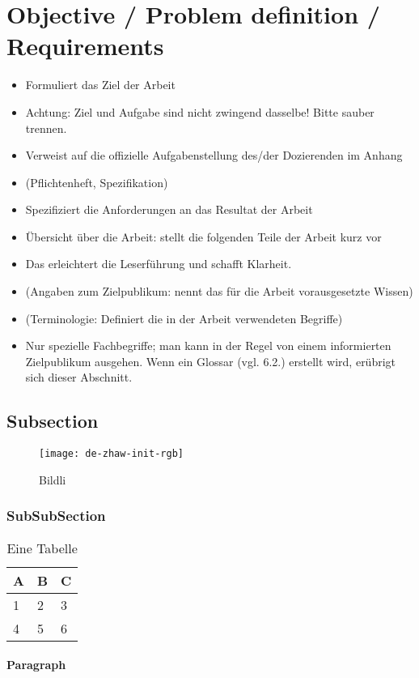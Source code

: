\section{Objective / Problem definition / Requirements}
\begin{itemize}
    \item Formuliert das Ziel der Arbeit
    \item Achtung: Ziel und Aufgabe sind nicht zwingend dasselbe! Bitte sauber trennen.
    \item Verweist auf die offizielle Aufgabenstellung des/der Dozierenden im Anhang
    \item (Pflichtenheft, Spezifikation)
    \item Spezifiziert die Anforderungen an das Resultat der Arbeit
    \item Übersicht über die Arbeit: stellt die folgenden Teile der Arbeit kurz vor
    \item Das erleichtert die Leserführung und schafft Klarheit.
    \item (Angaben zum Zielpublikum: nennt das für die Arbeit vorausgesetzte Wissen)
    \item (Terminologie: Definiert die in der Arbeit verwendeten Begriffe)
    \item Nur spezielle Fachbegriffe; man kann in der Regel von einem informierten Zielpublikum ausgehen.
    Wenn ein Glossar (vgl. 6.2.) erstellt wird, erübrigt sich dieser Abschnitt.
\end{itemize}

\lipsum[1] \cite{quelle2}

\subsection{Subsection}
\lipsum[1] \cite{quelle1}

\begin{figure}[H]
\centering
\texttt{[image: de-zhaw-init-rgb]}
\caption{Bildli}
\label{fig:bildli1}
\end{figure}


\subsubsection{SubSubSection}
\lipsum[1]
\begin{table}[H]
\centering
\caption{Eine Tabelle}
\label{tab:my-table}
\begin{tabular}{|l|l|l|}
\hline
\textbf{A} & \textbf{B} & \textbf{C} \\ \hline
1          & 2          & 3          \\ \hline
4          & 5          & 6          \\ \hline
\end{tabular}
\end{table}

\paragraph{Paragraph}
\lipsum[1]

 


